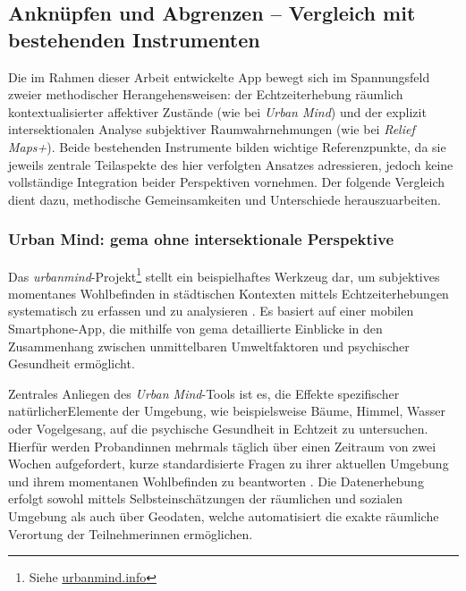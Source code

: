 \subsection{Anknüpfen und Abgrenzen – Vergleich mit bestehenden Instrumenten}

Die im Rahmen dieser Arbeit entwickelte App bewegt sich im Spannungsfeld zweier methodischer Herangehensweisen: der Echtzeiterhebung räumlich kontextualisierter affektiver Zustände (wie bei \textit{Urban Mind}) und der explizit intersektionalen Analyse subjektiver Raumwahrnehmungen (wie bei \textit{Relief Maps+}). Beide bestehenden Instrumente bilden wichtige Referenzpunkte, da sie jeweils zentrale Teilaspekte des hier verfolgten Ansatzes adressieren, jedoch keine vollständige Integration beider Perspektiven vornehmen. Der folgende Vergleich dient dazu, methodische Gemeinsamkeiten und Unterschiede herauszuarbeiten.

\subsubsection*{Urban Mind: \acrshort{gema} ohne intersektionale Perspektive}

Das \textit{\gls{urbanmind}}-Projekt\footnote{Siehe \href{https://www.urbanmind.info/}{urbanmind.info}} stellt ein beispielhaftes Werkzeug dar, um subjektives momentanes Wohlbefinden in städtischen Kontexten mittels Echtzeiterhebungen systematisch zu erfassen und zu analysieren \parencite{bakolisUrbanMindUsing2018}. Es basiert auf einer mobilen Smartphone-App, die mithilfe von \acrshort{gema} detaillierte Einblicke in den Zusammenhang zwischen unmittelbaren Umweltfaktoren und psychischer Gesundheit ermöglicht.

Zentrales Anliegen des \textit{Urban Mind}-Tools ist es, die Effekte spezifischer natürlicherElemente der Umgebung, wie beispielsweise Bäume, Himmel, Wasser oder Vogelgesang, auf die psychische Gesundheit in Echtzeit zu untersuchen. Hierfür werden Proband\genderstern innen mehrmals täglich über einen Zeitraum von zwei Wochen aufgefordert, kurze standardisierte Fragen zu ihrer aktuellen Umgebung und ihrem momentanen Wohlbefinden zu beantworten \parencite{bakolisUrbanMindUsing2018}. Die Datenerhebung erfolgt sowohl mittels Selbsteinschätzungen der räumlichen und sozialen Umgebung als auch über Geodaten, welche automatisiert die exakte räumliche Verortung der Teilnehmer\genderstern innen ermöglichen.

